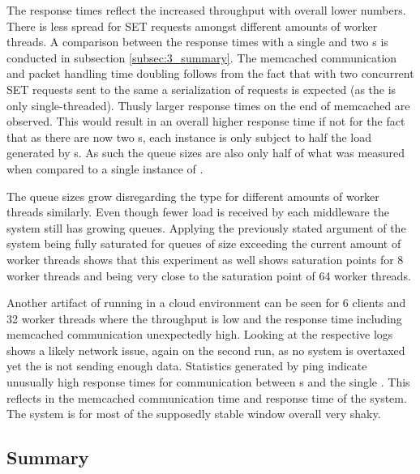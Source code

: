             The response times reflect the increased throughput with overall lower numbers. There is less spread for SET
            requests amongst different amounts of worker threads. A comparison between the response times with a single
            \mw{} and two \mw{}s is conducted in subsection \ref{subsec:3_summary}. The memcached communication and
            packet handling time doubling follows from the fact that with two concurrent \mw{} SET requests sent to the
            same \srv{} a serialization of requests is expected (as the \srv{} is only single-threaded). Thusly larger
            response times on the end of memcached are observed. This would result in an overall higher response time if
            not for the fact that as there are now two \mw{}s, each instance is only subject to half the load generated
            by \cli{}s. As such the queue sizes are also only half of what was measured when compared to a single
            instance of \mw{}.

            The queue sizes grow disregarding the type for different amounts of worker threads similarly. Even though
            fewer load is received by each middleware the system still has growing queues. Applying the previously
            stated argument of the system being fully saturated for queues of size exceeding the current amount of
            worker threads shows that this experiment as well shows saturation points for 8 worker threads
            and being very close to the saturation point of 64 worker threads.

            Another artifact of running in a cloud environment can be seen for 6 clients and 32 worker threads where the
            throughput is low and the response time including memcached communication unexpectedly high. Looking at the
            respective logs shows a likely network issue, again on the second run, as no system is overtaxed yet the
            \srv{} is not sending enough data. Statistics generated by ping indicate unusually high response times for
            communication between \mw{}s and the single \srv{}. This reflects in the memcached communication time and
            response time of the system. The system is for most of the supposedly stable window overall very shaky.

    \subsection{Summary\label{subsec:3_summary}}

